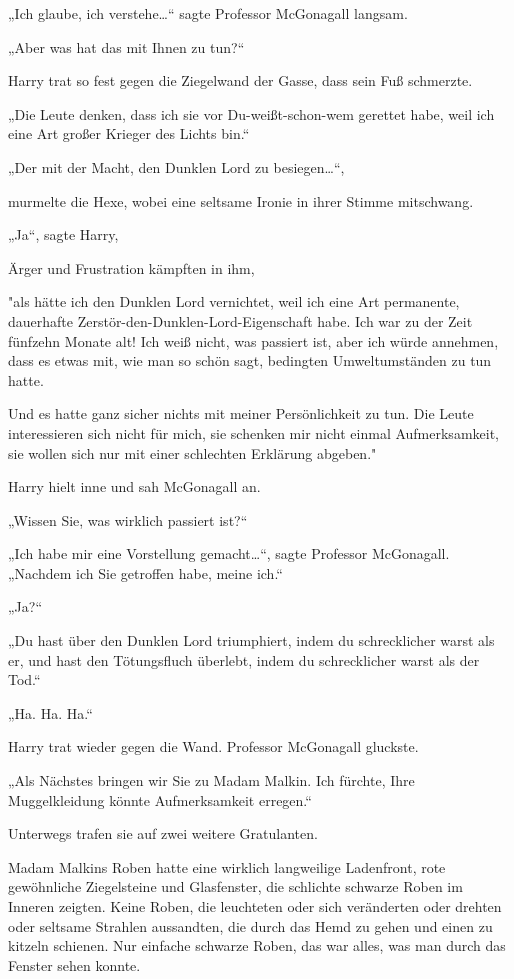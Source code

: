 {„Ich glaube, ich verstehe…“ sagte Professor McGonagall langsam.

„Aber was hat das mit Ihnen zu tun?“

Harry trat so fest gegen die Ziegelwand der Gasse, dass sein Fuß schmerzte.

„Die Leute denken, dass ich sie vor Du-weißt-schon-wem gerettet habe, weil ich eine Art großer Krieger des Lichts bin.“

„Der mit der Macht, den Dunklen Lord zu besiegen…“,

murmelte die Hexe, wobei eine seltsame Ironie in ihrer Stimme mitschwang.

„Ja“, sagte Harry,

Ärger und Frustration kämpften in ihm,

"als hätte ich den Dunklen Lord vernichtet, weil ich eine Art permanente, dauerhafte Zerstör-den-Dunklen-Lord-Eigenschaft habe. Ich war zu der Zeit fünfzehn Monate alt! Ich weiß nicht, was passiert ist, aber ich würde annehmen, dass es etwas mit, wie man so schön sagt, bedingten Umweltumständen zu tun hatte.

Und es hatte ganz sicher nichts mit meiner Persönlichkeit zu tun. Die Leute interessieren sich nicht für mich, sie schenken mir nicht einmal Aufmerksamkeit, sie wollen sich nur mit einer schlechten Erklärung abgeben."

Harry hielt inne und sah McGonagall an.

„Wissen Sie, was wirklich passiert ist?“

„Ich habe mir eine Vorstellung gemacht…“, sagte Professor McGonagall. „Nachdem ich Sie getroffen habe, meine ich.“

„Ja?“

„Du hast über den Dunklen Lord triumphiert, indem du schrecklicher warst als er, und hast den Tötungsfluch überlebt, indem du schrecklicher warst als der Tod.“

„Ha. Ha. Ha.“

Harry trat wieder gegen die Wand. Professor McGonagall gluckste.

„Als Nächstes bringen wir Sie zu Madam Malkin. Ich fürchte, Ihre Muggelkleidung könnte Aufmerksamkeit erregen.“

Unterwegs trafen sie auf zwei weitere Gratulanten.

Madam Malkins Roben hatte eine wirklich langweilige Ladenfront, rote gewöhnliche Ziegelsteine und Glasfenster, die schlichte schwarze Roben im Inneren zeigten. Keine Roben, die leuchteten oder sich veränderten oder drehten oder seltsame Strahlen aussandten, die durch das Hemd zu gehen und einen zu kitzeln schienen. Nur einfache schwarze Roben, das war alles, was man durch das Fenster sehen konnte.

}

